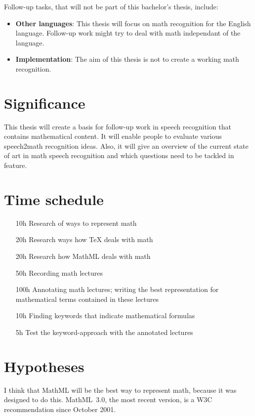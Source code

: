 \documentclass[a4paper]{scrartcl}
\begin{document}
    Follow-up tasks, that will not be part of this bachelor's thesis,
    include:
    \begin{itemize}
        \item \textbf{Other languages}: This thesis will focus on math
            recognition for the English language. Follow-up work might
            try to deal with math independant of the language.
        \item \textbf{Implementation}: The aim of this thesis is not
            to create a working math recognition.
    \end{itemize}

\section{Significance}
This thesis will create a basis for follow-up work in speech recognition
that contains mathematical content. It will enable people to evaluate
various speech2math recognition ideas. Also, it will give an overview
of the current state of art in math speech recognition and which
questions need to be tackled in feature.

\section{Time schedule}
\begin{itemize}
    \item[10h] Research of ways to represent math
    \item[20h] Research ways how \TeX{} deals with math
    \item[20h] Research how MathML deals with math
    \item[50h] Recording math lectures
    \item[100h] Annotating math lectures; writing the best 
                representation for mathematical terms contained in 
                these lectures
    \item[10h] Finding keywords that indicate mathematical formulas
    \item[5h] Test the keyword-approach with the annotated lectures
\end{itemize}

\renewcommand\refname{Related Literature}
\nocite{*}



\section{Hypotheses}
I think that MathML will be the best way to represent math, because
it was designed to do this. MathML~3.0, the most recent version,
is a W3C recommendation since October 2001.
\end{document}
